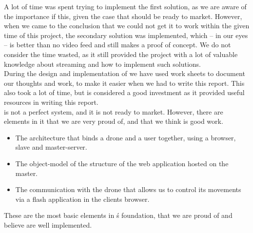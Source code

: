 A lot of time was spent trying to implement the first solution, as we are aware of the importance if this, given the case that \projectname{} should be ready to market. 
However, when we came to the conclusion that we could not get it to work within the given time of this project, the secondary solution was implemented, which -- in our eyes -- is better than no video feed and still makes a proof of concept. 
We do not consider the time wasted, as it still provided the project with a lot of valuable knowledge about streaming and how to implement such solutions. \\

During the design and implementation of \projectname{} we have used work sheets to document our thoughts and work, to make it easier when we had to write this report. 
This also took a lot of time, but is considered a good investment as it provided useful resources in writing this report. \\

\projectname{} is not a perfect system, and it is not ready to market.
However, there are elements in it that we are very proud of, and that we think is good work. 

\begin{itemize}
	\item The architecture that binds a drone and a user together, using a browser, slave and master-server. 
	\item The object-model of the structure of the web application hosted on the master.
	\item The communication with the drone that allows us to control its movements via a flash application in the clients browser.
\end{itemize}

These are the most basic elements in \projectname{}\'s foundation, that we are proud of and believe are well implemented.






